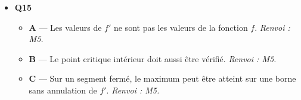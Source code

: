 \begin{itemize}
\begin{itemize}
    \item \textbf{B} — L'élève a remplace a tort le facteur $120 - 6x$ de $V'(x)=(120-2x)(120-6x)$ par $120 - 3x$ ; résoudre $120 - 3x=0$ conduit exactement a $x=40$. \emph{Renvoi : M5.}
    \item \textbf{D} — L'élève a remplace a tort le facteur $120 - 6x$ par $60 - 6x$ ; résoudre $60 - 6x=0$ conduit exactement a $x=10$. \emph{Renvoi : M5.}
  \end{itemize}
  \item \textbf{Q15}
  \begin{itemize}
    \item \textbf{A} — Les valeurs de $f'$ ne sont pas les valeurs de la fonction $f$. \emph{Renvoi : M5.}
    \item \textbf{B} — Le point critique intérieur doit aussi être vérifié. \emph{Renvoi : M5.}
    \item \textbf{C} — Sur un segment fermé, le maximum peut être atteint sur une borne sans annulation de $f'$. \emph{Renvoi : M5.}
  \end{itemize}
\end{itemize}
\fi
